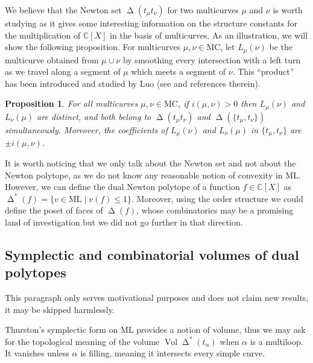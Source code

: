 \documentclass{amsart}
\newtheorem{propintro}{Proposition}
\newcommand{\C}{\mathbb{C}}
\newcommand{\ML}{\mathrm{ML}}
\newcommand{\MC}{\mathrm{MC}}
\DeclareMathOperator{\Card}{Card}
\DeclareMathOperator{\Vol}{Vol}
\DeclareMathOperator{\Mod}{Mod}
\DeclareMathOperator{\NewSet}{\Delta}
\begin{document}
We believe that the Newton set $\NewSet(t_\mu t_\nu)$ for two multicurves $\mu$ and $\nu$ is worth studying as it gives some interesting information on the structure constants for the multiplication of $\C[X]$ in the basis of multicurves.
%
%
As an illustration, we will show the following proposition. For multicurves $\mu,\nu \in \MC$, let $L_\mu(\nu)$ be the multicurve obtained from $\mu \cup \nu$ by smoothing every intersection with a left turn as we travel along a segment of $\mu$ which meets a segment of $\nu$. This ``product'' has been introduced and studied by Luo (see \cite{Luo_simple_2010} and references therein).

\begin{propintro}
For all multicurves $\mu,\nu \in \MC$, if $i(\mu,\nu)>0$ then $L_\mu(\nu)$ and $L_\nu(\mu)$ are distinct, and both belong to $\NewSet(t_\mu t_\nu)$ and $\NewSet(\{t_\mu, t_\nu\})$ simultaneously.
%
Moreover, the coefficients of $L_\mu(\nu)$ and $L_\nu(\mu)$ in $\{t_\mu,t_\nu\}$ are $\pm i(\mu,\nu)$.
\end{propintro}

It is worth noticing that we only talk about the Newton set and not about the Newton polytope, as we do not know any reasonable notion of convexity in $\ML$.
%
However, we can define the dual Newton polytope of a function $f\in \C[X]$ as $\NewSet^*(f)=\{v\in \ML \mid v(f)\le 1\}$. %
%
Moreover, using the order structure we could define the poset of faces of $\NewSet(f)$, whose combinatorics may be a promising land of investigation but we did not go further in that direction.

\subsection*{Symplectic and combinatorial volumes of dual polytopes}

This paragraph only serves motivational purposes and does not claim new results, it may be skipped harmlessly. 


Thurston's symplectic form on $\ML$ provides a notion of volume, thus we may ask for the topological meaning of the volume $\Vol \NewSet^*(t_\alpha)$ when $\alpha$ is a multiloop. It vanishes unless $\alpha$ is filling, meaning it intersects every simple curve.
%
\end{document}
